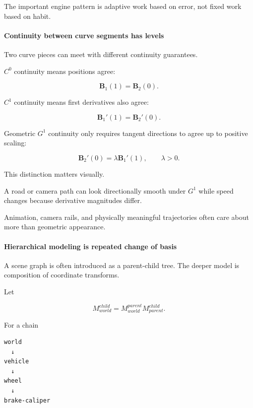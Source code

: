 The important engine pattern is adaptive work based on error, not fixed work based on habit.

\paragraph{Continuity between curve segments has levels}\label{03-visual-computing-i-ch001-continuity-between-curve-segments-has-levels}

\hypertarget{03-visual-computing-i-ch001-continuity-between-curve-segments-has-levels}{}

Two curve pieces can meet with different continuity guarantees.

\(C^0\) continuity means positions agree:

\[
\mathbf B_1(1)=\mathbf B_2(0).
\]

\(C^1\) continuity means first derivatives also agree:

\[
\mathbf B_1'(1)=\mathbf B_2'(0).
\]

Geometric \(G^1\) continuity only requires tangent directions to agree up to positive scaling:

\[
\mathbf B_2'(0)=\lambda\mathbf B_1'(1),
\qquad
\lambda>0.
\]

This distinction matters visually.

A road or camera path can look directionally smooth under \(G^1\) while speed changes because derivative magnitudes differ.

Animation, camera rails, and physically meaningful trajectories often care about more than geometric appearance.

\paragraph{Hierarchical modeling is repeated change of basis}\label{03-visual-computing-i-ch001-hierarchical-modeling-is-repeated-change-of-basis}

\hypertarget{03-visual-computing-i-ch001-hierarchical-modeling-is-repeated-change-of-basis}{}

A scene graph is often introduced as a parent-child tree. The deeper model is composition of coordinate transforms.

Let

\[
M_{world}^{child}
=
M_{world}^{parent}
M_{parent}^{child}.
\]

For a chain

\begin{verbatim}
world
  ↓
vehicle
  ↓
wheel
  ↓
brake-caliper
\end{verbatim}

